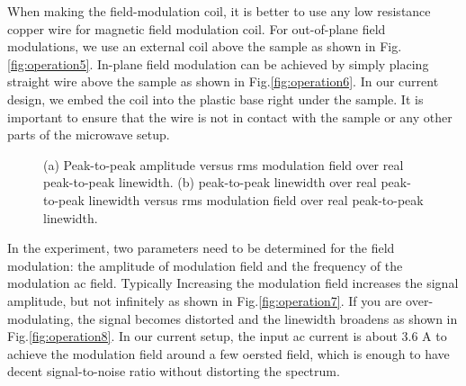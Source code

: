  When making the field-modulation coil, it is better to use any low resistance copper wire for magnetic field modulation coil. For out-of-plane field modulations, we use an external coil above the sample as shown in Fig.\ref{fig:operation5}. In-plane field modulation can be achieved by simply placing straight wire above the sample as shown in Fig.\ref{fig:operation6}. In our current design, we embed the coil into the plastic base right under the sample. It is important to ensure that the wire is not in contact with the sample or any other parts of the microwave setup. 


\begin{figure}[h]
\centering
{}
\caption{(a) Peak-to-peak amplitude versus rms modulation field over real peak-to-peak linewidth. (b) peak-to-peak linewidth over real peak-to-peak linewidth versus rms modulation field over real peak-to-peak linewidth.}
\end{figure}

In the experiment, two parameters need to be determined for the field modulation: the amplitude of modulation field and the frequency of the modulation ac field. Typically Increasing the modulation field increases the signal amplitude, but not infinitely as shown in Fig.\ref{fig:operation7}. If you are over-modulating, the signal becomes distorted and the linewidth broadens as shown in Fig.\ref{fig:operation8}. In our current setup, the input ac current is about 3.6 A to achieve the modulation field around a few oersted field, which is enough to have decent signal-to-noise ratio without distorting the spectrum.





\clearpage




